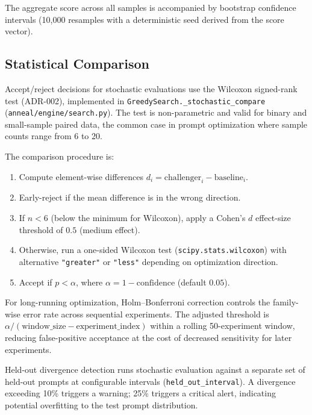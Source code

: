The aggregate score across all samples is accompanied by bootstrap confidence intervals (10{,}000 resamples with a deterministic seed derived from the score vector).

\subsection{Statistical Comparison}\label{sec:stat-comparison}

Accept/reject decisions for stochastic evaluations use the Wilcoxon signed-rank test (ADR-002), implemented in \texttt{Greedy\allowbreak{}Search.\allowbreak{}\_stochastic\allowbreak{}\_compare} (\texttt{anneal/\allowbreak{}engine/\allowbreak{}search.py}).
The test is non-parametric and valid for binary and small-sample paired data, the common case in prompt optimization where sample counts range from 6 to 20.

The comparison procedure is:
\begin{enumerate}
    \item Compute element-wise differences $d_i = \text{challenger}_i - \text{baseline}_i$.
    \item Early-reject if the mean difference is in the wrong direction.
    \item If $n < 6$ (below the minimum for Wilcoxon), apply a Cohen's $d$ effect-size threshold of $0.5$ (medium effect).
    \item Otherwise, run a one-sided Wilcoxon test (\texttt{scipy.\allowbreak{}stats.\allowbreak{}wilcoxon}) with alternative \texttt{"greater"} or \texttt{"less"} depending on optimization direction.
    \item Accept if $p < \alpha$, where $\alpha = 1 - \text{confidence}$ (default $0.05$).
\end{enumerate}

For long-running optimization, Holm--Bonferroni correction controls the family-wise error rate across sequential experiments.
The adjusted threshold is $\alpha / (\text{window\_size} - \text{experiment\_index})$ within a rolling 50-experiment window, reducing false-positive acceptance at the cost of decreased sensitivity for later experiments.

Held-out divergence detection runs stochastic evaluation against a separate set of held-out prompts at configurable intervals (\texttt{held\_out\_interval}).
A divergence exceeding 10\% triggers a warning; 25\% triggers a critical alert, indicating potential overfitting to the test prompt distribution.

